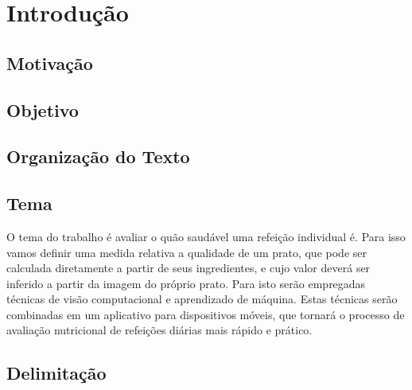 \section{Introdução\label{sec:intro}}

\subsection{Motivação\label{subsec:motiv}}


\subsection{Objetivo\label{subsec:obj}}


\subsection{Organização do Texto\label{subsec:org_texto}}


\subsection{Tema}

O tema do trabalho é avaliar o quão saudável uma refeição individual é. Para isso vamos definir uma medida relativa a qualidade de um prato, que pode ser calculada diretamente a partir de seus ingredientes, e cujo valor deverá ser inferido a partir da imagem do próprio prato. Para isto serão empregadas técnicas de visão computacional e aprendizado de máquina. Estas técnicas serão combinadas em um aplicativo para dispositivos móveis, que tornará o processo de avaliação nutricional de refeições diárias mais rápido e prático.


\subsection{Delimitação}


